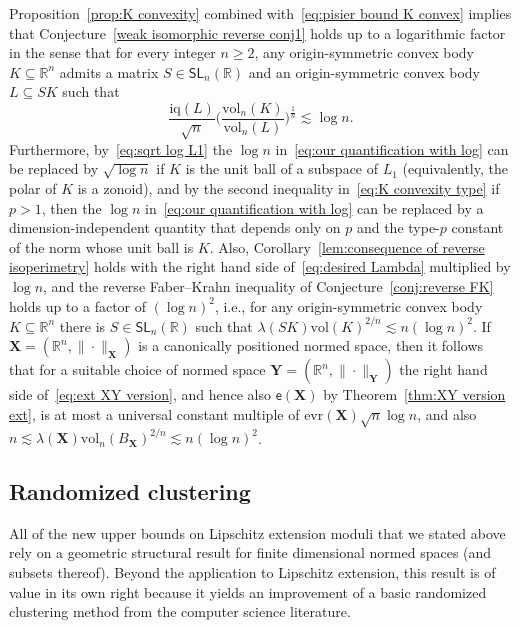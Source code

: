 \documentclass[11pt,reqno]{amsart}
\renewcommand{\ge}{\geqslant}
\newcommand{\evr}{\mathrm{evr}}
\newcommand{\X}{\mathbf X}
\newcommand{\Y}{\mathbf Y}
\newcommand{\R}{\mathbb R}
\theoremstyle{remark}
\newcommand{\iq}{\mathrm{iq}}
\newcommand{\SL}{\mathsf{SL}}
\renewcommand{\subset}{\subseteq}
\newcommand{\ee}{\mathsf{e}}
\newcommand{\vol}{\mathrm{vol}}
\renewcommand{\1}{\mathbf 1}
\begin{document}
Proposition~\ref{prop:K convexity} combined with~\eqref{eq:pisier bound K convex} implies that Conjecture~\ref{weak isomorphic reverse conj1} holds up to a logarithmic factor in the sense that for every integer $n\ge 2$, any origin-symmetric convex body $K\subset \R^n$ admits a matrix $S\in \SL_n(\R)$ and an origin-symmetric convex body $L\subset SK$ such that
\begin{equation}\label{eq:our quantification with log}
\frac{\iq(L)}{\sqrt{n}}\bigg(\frac{\vol_n(K)}{\vol_n(L)}\bigg)^{\frac{1}{n}}\lesssim \log n.
\end{equation}
Furthermore, by~\eqref{eq:sqrt log L1} the $\log n$ in~\eqref{eq:our quantification with log}  can be replaced by $\sqrt{\log n}$ if $K$ is the unit ball of a subspace of $L_1$ (equivalently, the polar of $K$ is a zonoid), and by  the second inequality in~\eqref{eq:K convexity type} if $p>1$, then the $\log n$ in~\eqref{eq:our quantification with log} can be replaced by a dimension-independent quantity that depends only on $p$ and the type-$p$ constant of the norm whose unit ball is $K$. Also, Corollary~\ref{lem:consequence of reverse isoperimetry} holds with the right hand side of~\eqref{eq:desired Lambda} multiplied by $\log n$, and the reverse Faber--Krahn inequality of Conjecture~\ref{conj:reverse FK}  holds up to a factor of $(\log n)^2$, i.e., for any origin-symmetric convex body $K\subset \R^n$ there is  $S\in \SL_n(\R)$ such that
$
 \lambda(SK)\vol(K)^{2/n}\lesssim n(\log n)^2$.
If $\X=(\R^n,\|\cdot\|_\X)$ is a canonically positioned normed space, then it follows that for a suitable choice of normed space $\Y=(\R^n,\|\cdot\|_\Y)$ the right hand side of~\eqref{eq:ext XY version}, and hence also $\ee(\X)$ by Theorem~\ref{thm:XY version ext},  is at most a universal constant multiple of $\evr(\X)\sqrt{n}\log n$, and also $n\lesssim \lambda(\X)\vol_n(B_\X)^{2/n}\lesssim n(\log n)^2$.










\subsection{Randomized clustering}\label{sec:cluster} All of the new upper bounds on  Lipschitz extension moduli that we stated above rely on a  geometric structural result for  finite dimensional normed spaces (and subsets thereof). Beyond the application to Lipschitz extension, this result is of value in its own right because it yields an improvement of a basic randomized clustering method from the computer science literature.
\end{document}
